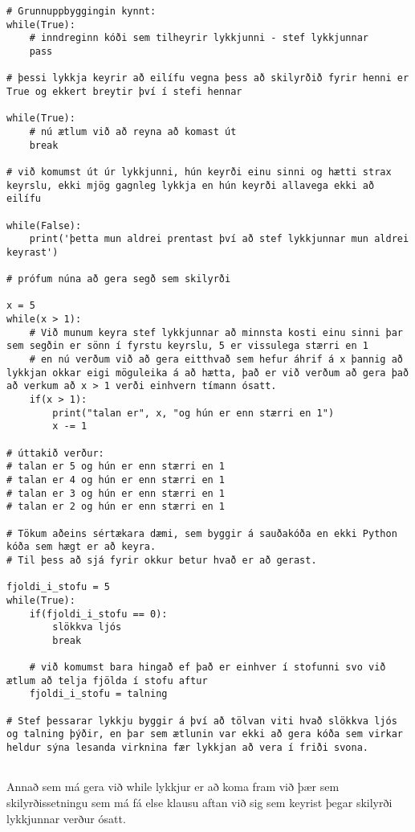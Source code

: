 \begin{lstlisting}[caption=while lykkjur, label=lst:lykkjur-while]
# Grunnuppbyggingin kynnt:
while(True):
	# inndreginn kóði sem tilheyrir lykkjunni - stef lykkjunnar
	pass
	
# þessi lykkja keyrir að eilífu vegna þess að skilyrðið fyrir henni er True og ekkert breytir því í stefi hennar

while(True):
	# nú ætlum við að reyna að komast út
	break
	
# við komumst út úr lykkjunni, hún keyrði einu sinni og hætti strax keyrslu, ekki mjög gagnleg lykkja en hún keyrði allavega ekki að eilífu

while(False):
	print('þetta mun aldrei prentast því að stef lykkjunnar mun aldrei keyrast')

# prófum núna að gera segð sem skilyrði

x = 5
while(x > 1):
	# Við munum keyra stef lykkjunnar að minnsta kosti einu sinni þar sem segðin er sönn í fyrstu keyrslu, 5 er vissulega stærri en 1
	# en nú verðum við að gera eitthvað sem hefur áhrif á x þannig að lykkjan okkar eigi möguleika á að hætta, það er við verðum að gera það að verkum að x > 1 verði einhvern tímann ósatt.
	if(x > 1):
		print("talan er", x, "og hún er enn stærri en 1")
		x -= 1
		
# úttakið verður:
# talan er 5 og hún er enn stærri en 1
# talan er 4 og hún er enn stærri en 1
# talan er 3 og hún er enn stærri en 1
# talan er 2 og hún er enn stærri en 1

# Tökum aðeins sértækara dæmi, sem byggir á sauðakóða en ekki Python kóða sem hægt er að keyra. 
# Til þess að sjá fyrir okkur betur hvað er að gerast.

fjoldi_i_stofu = 5
while(True):
	if(fjoldi_i_stofu == 0):
		slökkva ljós
		break
		
	# við komumst bara hingað ef það er einhver í stofunni svo við ætlum að telja fjölda í stofu aftur
	fjoldi_i_stofu = talning
	
# Stef þessarar lykkju byggir á því að tölvan viti hvað slökkva ljós og talning þýðir, en þar sem ætlunin var ekki að gera kóða sem virkar heldur sýna lesanda virknina fær lykkjan að vera í friði svona.


\end{lstlisting}

Annað sem má gera við while lykkjur er að koma fram við þær sem skilyrðissetningu sem má fá else klausu aftan við sig sem keyrist þegar skilyrði lykkjunnar verður ósatt.

